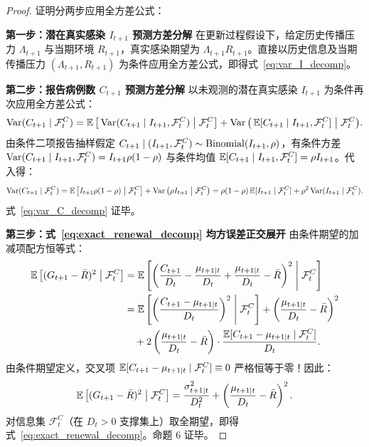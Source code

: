 \begin{proof}
证明分两步应用全方差公式：

\textbf{第一步：潜在真实感染 $I_{t+1}$ 预测方差分解}
在更新过程假设下，给定历史传播压力 $\Lambda_{t+1}$ 与当期环境 $R_{t+1}$，真实感染期望为 $\Lambda_{t+1} R_{t+1}$。直接以历史信息及当期传播压力 $(\Lambda_{t+1}, R_{t+1})$ 为条件应用全方差公式，即得式~\eqref{eq:var_I_decomp}。

\textbf{第二步：报告病例数 $C_{t+1}$ 预测方差分解}
以未观测的潜在真实感染 $I_{t+1}$ 为条件再次应用全方差公式：
\begin{equation}
\operatorname{Var}(C_{t+1} \mid \mathcal{F}_t^C) = \operatorname{\mathbb{E}}\big[ \operatorname{Var}(C_{t+1} \mid I_{t+1}, \mathcal{F}_t^C) \;\big|\; \mathcal{F}_t^C \big] + \operatorname{Var}\big( \operatorname{\mathbb{E}}[C_{t+1} \mid I_{t+1}, \mathcal{F}_t^C] \;\big|\; \mathcal{F}_t^C \big).
\end{equation}
由条件二项报告抽样假定 $C_{t+1} \mid (I_{t+1}, \mathcal{F}_t^C) \sim \operatorname{Binomial}(I_{t+1}, \rho)$，有条件方差 $\operatorname{Var}(C_{t+1} \mid I_{t+1}, \mathcal{F}_t^C) = I_{t+1}\rho(1-\rho)$ 与条件均值 $\operatorname{\mathbb{E}}[C_{t+1} \mid I_{t+1}, \mathcal{F}_t^C] = \rho I_{t+1}$。代入得：
\begin{equation}
\operatorname{Var}(C_{t+1} \mid \mathcal{F}_t^C) = \operatorname{\mathbb{E}}\big[ I_{t+1}\rho(1-\rho) \;\big|\; \mathcal{F}_t^C \big] + \operatorname{Var}\big( \rho I_{t+1} \;\big|\; \mathcal{F}_t^C \big) = \rho(1-\rho)\operatorname{\mathbb{E}}[I_{t+1} \mid \mathcal{F}_t^C] + \rho^2 \operatorname{Var}(I_{t+1} \mid \mathcal{F}_t^C).
\end{equation}
式~\eqref{eq:var_C_decomp} 证毕。

\textbf{第三步：式~\eqref{eq:exact_renewal_decomp} 均方误差正交展开}
由条件期望的加减项配方恒等式：
\begin{align}
\operatorname{\mathbb{E}}\left[ (G_{t+1} - \bar{R})^2 \;\middle|\; \mathcal{F}_t^C \right] &= \operatorname{\mathbb{E}}\left[ \left( \frac{C_{t+1}}{D_t} - \frac{\mu_{t+1 \mid t}}{D_t} + \frac{\mu_{t+1 \mid t}}{D_t} - \bar{R} \right)^2 \;\middle|\; \mathcal{F}_t^C \right] \notag \\
&= \operatorname{\mathbb{E}}\left[ \left( \frac{C_{t+1} - \mu_{t+1 \mid t}}{D_t} \right)^2 \;\middle|\; \mathcal{F}_t^C \right] + \left( \frac{\mu_{t+1 \mid t}}{D_t} - \bar{R} \right)^2 \notag \\
&\quad + 2 \left( \frac{\mu_{t+1 \mid t}}{D_t} - \bar{R} \right) \cdot \frac{\operatorname{\mathbb{E}}[C_{t+1} - \mu_{t+1 \mid t} \mid \mathcal{F}_t^C]}{D_t}.
\end{align}
由条件期望定义，交叉项 $\operatorname{\mathbb{E}}[C_{t+1} - \mu_{t+1 \mid t} \mid \mathcal{F}_t^C] \equiv 0$ 严格恒等于零！因此：
\begin{equation}
\operatorname{\mathbb{E}}\left[ (G_{t+1} - \bar{R})^2 \;\middle|\; \mathcal{F}_t^C \right] = \frac{\sigma_{t+1 \mid t}^2}{D_t^2} + \left( \frac{\mu_{t+1 \mid t}}{D_t} - \bar{R} \right)^2.
\end{equation}
对信息集 $\mathcal{F}_t^C$（在 $D_t > 0$ 支撑集上）取全期望，即得式~\eqref{eq:exact_renewal_decomp}。命题 6 证毕。
\end{proof}

